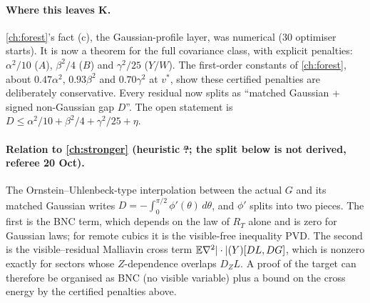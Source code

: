 \paragraph{Where this leaves K.} \autoref{ch:forest}'s fact (c), the Gaussian-profile layer, was numerical (30 optimiser starts). It is now a theorem for the full covariance class, with
explicit penalties: $\alpha^2/10$ ($A$), $\beta^2/4$ ($B$) and $\gamma^2/25$ ($Y/W$). The first-order constants of \autoref{ch:forest}, about $0.47\alpha^2$, $0.93\beta^2$ and $0.70\gamma^2$
at $v^*$, show these certified penalties are deliberately conservative. Every residual now splits as ``matched Gaussian + signed non-Gaussian gap $D$''. The open statement is
$D\le\alpha^2/10+\beta^2/4+\gamma^2/25+\eta$.
\paragraph{Relation to \autoref{ch:stronger} (heuristic \st{?}; the split below is not derived, referee 20 Oct).} The Ornstein--Uhlenbeck-type interpolation between the actual $G$ and its matched Gaussian writes $D=-\int_0^{\pi/2}\phi'(\theta)\,d\theta$, and
$\phi'$ splits into two pieces. The first is the BNC term, which depends on the law of $R_T$ alone and is zero for Gaussian laws; for remote cubics it is the visible-free inequality PVD. The second
is the visible--residual Malliavin cross term $\mathbb E\nabla^2|\cdot|(Y)[DL,DG]$, which is nonzero exactly for sectors whose $Z$-dependence overlaps $D_ZL$. A proof of the target can therefore be
organised as BNC (no visible variable) plus a bound on the cross energy by the certified penalties above.
